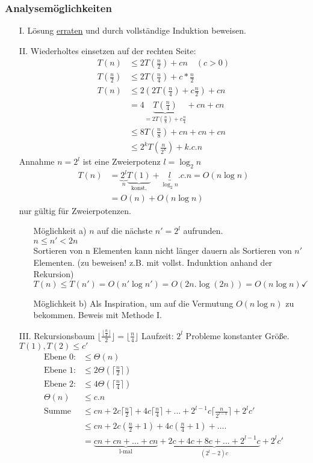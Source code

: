 \subsubsection{Analysemöglichkeiten}
\begin{enumerate}
\item[I.] Lösung \underline{erraten} und durch vollständige Induktion beweisen.
\item[II.] Wiederholtes einsetzen auf der rechten Seite:
\begin{align*}
T(n) &\leq 2T(\frac{n}{2})+ c n \quad (c > 0)\\
T(\frac{n}{2}) &\leq 2 T(\frac{n}{4}) + c * \frac{n}{2}\\
T(n) &\leq 2(2T(\frac{n}{4}) + c \frac{n}{2})+c n\\
&= 4 \underbrace{T(\frac{n}{4})}_{= 2T(\frac{n}{8})+c\frac{n}{4}}+cn+cn\\
&\leq 8T(\frac{n}{8})+cn+cn+cn\\
&\leq 2^k T(\frac{n}{2^k})+k.c.n
\end{align*}
Annahme $n=2^l$ ist eine Zweierpotenz $l = \log_2 n$
\begin{align*}
T(n)&= \underbrace{2^l}_n \underbrace{T(1)}_{\text{konst.}} +\underbrace{l}_{\log_2 n}.c.n = O(n \log n)\\
 &= O(n) + O(n \log n)
\end{align*}
nur gültig für Zweierpotenzen.
\begin{enumerate}
\item[Möglichkeit a)] $n$ auf die nächste $n' = 2^l$ aufrunden.\\
$n \leq n' < 2n$\\
Sortieren von n Elementen kann nicht länger dauern als Sortieren von $n'$ Elementen. (zu beweisen! z.B. mit vollst. Indunktion anhand der Rekursion)\\
$T(n) \leq T(n') = O(n' \log n') = O(2n. \log(2n)) = O(n \log n) \checkmark$
\item[Möglichkeit b)] Als Inspiration, um auf die Vermutung $O(n \log n)$ zu bekommen. Beweis mit Methode I.
\end{enumerate}
\item[III.] Rekursionsbaum $\lfloor \frac{\lfloor \frac{n}{2} \rfloor}{2}\rfloor = \lfloor \frac{n}{4} \rfloor$
Laufzeit: $2^l$ Probleme konstanter Größe. $T(1), T(2) \leq c'$
\begin{align*}
\text{Ebene 0}: &\leq \Theta(n)\\
\text{Ebene 1}: &\leq 2 \Theta(\lceil \frac{n}{2} \rceil)\\
\text{Ebene 2}: &\leq 4 \Theta(\lceil \frac{n}{4} \rceil)\\
\Theta(n) &\leq c.n\\
\text{Summe} &\leq c n + 2 c \lceil \frac{n}{2} \rceil + 4 c \lceil \frac{n}{4} \rceil + ... + 2^{l-1} c \lceil \frac{n}{2^{l-1}} \rceil + 2^l c'\\
&\leq cn + 2c(\frac{n}{2} +1) + 4c(\frac{n}{4} +1)+....\\
&=  \underbrace{cn + cn + ... + cn}_\text{l-mal} + \underbrace{2c + 4c + 8c + ... + 2^{l-1}c}_{(2^l -2)c} + 2^l c'\\
\end{align*}
\end{enumerate}
